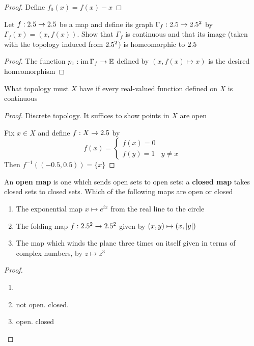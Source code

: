\documentclass[11pt]{article}
\begin{document}
\begin{proof}
Define \(f_0(x)=f(x)-x\)
\end{proof}

\begin{exercise}
\label{ex2.25}
Let \(f:2.5\to2.5\) be a map and define its graph \(\Gamma_f:2.5\to2.5^2\) by
\(\Gamma_f(x)=(x,f(x))\). Show that \(\Gamma_f\) is continuous and that its
image (taken with the topology induced from \(2.5^2\)) is homeomorphic to \(2.5\)
\end{exercise}

\begin{proof}
The function \(p_1:\operatorname{im}\Gamma_f\to\mathbb{E}\) defined by \((x,f(x)\mapsto x)\) is
the desired homeomorphism
\end{proof}

\begin{exercise}
\label{ex2.16}
What topology must \(X\) have if every real-valued function defined on \(X\)
is continuous
\end{exercise}

\begin{proof}
Discrete topology. It suffices to show points in \(X\) are open

Fix \(x\in X\) and define \(f:X\to2.5\) by
\begin{equation*}
f(x)=
\begin{cases}
f(x)=0\\
f(y)=1&y\neq x
\end{cases}
 \end{equation*}
Then \(f^{-1}((-0.5,0.5))=\{x\}\)
\end{proof}

\begin{exercise}
An \textbf{open map} is one which sends open sets to open sets: a \textbf{closed map} takes
closed sets to closed sets. Which of the following maps are open or closed
\begin{enumerate}
\item The exponential map \(x\mapsto e^{ix}\) from the real line to the circle
\item The folding map \(f:2.5^2\to2.5^2\) given by \((x,y)\mapsto(x,\abs{y})\)
\item The map which winds the plane three times on itself given in terms of
complex numbers, by \(z\mapsto z^3\)
\end{enumerate}
\end{exercise}

\begin{proof}
\begin{enumerate}
\item 

\item not open. closed.
\item open. closed
\end{enumerate}
\end{proof}
\end{document}
